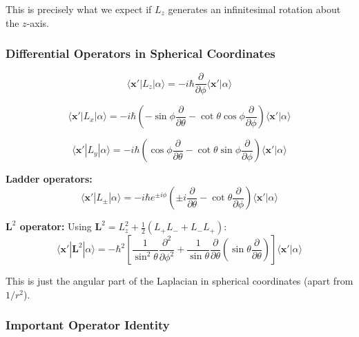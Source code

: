 \documentclass[11pt,a4paper]{article}
\begin{document}
This is precisely what we expect if $L_z$ generates an infinitesimal rotation about the $z$-axis.

\subsubsection{Differential Operators in Spherical Coordinates}

\begin{equation}
\boxed{\langle\mathbf{x}'|L_z|\alpha\rangle = -i\hbar\frac{\partial}{\partial\phi}\langle\mathbf{x}'|\alpha\rangle}
\tag{3.218}
\end{equation}

\begin{equation}
\langle\mathbf{x}'|L_x|\alpha\rangle = -i\hbar\left(-\sin\phi\frac{\partial}{\partial\theta} - \cot\theta\cos\phi\frac{\partial}{\partial\phi}\right)\langle\mathbf{x}'|\alpha\rangle
\tag{3.220}
\end{equation}

\begin{equation}
\langle\mathbf{x}'|L_y|\alpha\rangle = -i\hbar\left(\cos\phi\frac{\partial}{\partial\theta} - \cot\theta\sin\phi\frac{\partial}{\partial\phi}\right)\langle\mathbf{x}'|\alpha\rangle
\tag{3.221}
\end{equation}

\textbf{Ladder operators:}
\begin{equation}
\boxed{\langle\mathbf{x}'|L_\pm|\alpha\rangle = -i\hbar e^{\pm i\phi}\left(\pm i\frac{\partial}{\partial\theta} - \cot\theta\frac{\partial}{\partial\phi}\right)\langle\mathbf{x}'|\alpha\rangle}
\tag{3.222}
\end{equation}

\textbf{$\mathbf{L}^2$ operator:}
Using $\mathbf{L}^2 = L_z^2 + \frac{1}{2}(L_+ L_- + L_- L_+)$:
\begin{equation}
\boxed{\langle\mathbf{x}'|\mathbf{L}^2|\alpha\rangle = -\hbar^2\left[\frac{1}{\sin^2\theta}\frac{\partial^2}{\partial\phi^2} + \frac{1}{\sin\theta}\frac{\partial}{\partial\theta}\left(\sin\theta\frac{\partial}{\partial\theta}\right)\right]\langle\mathbf{x}'|\alpha\rangle}
\tag{3.224}
\end{equation}

This is just the angular part of the Laplacian in spherical coordinates (apart from $1/r^2$).

\subsubsection{Important Operator Identity}
\end{document}
